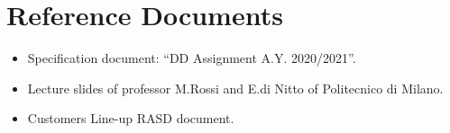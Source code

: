 \section{Reference Documents}

\begin{itemize}
	\item Specification document: “DD Assignment A.Y. 2020/2021”.
	\item Lecture slides of professor M.Rossi and E.di Nitto of Politecnico di Milano.
	\item Customers Line-up RASD document.
\end{itemize}